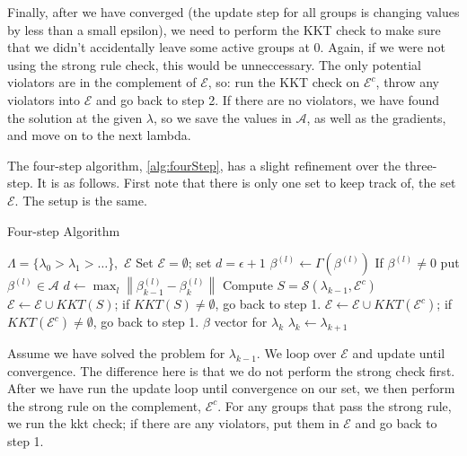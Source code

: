 \documentclass[titlepage]{article}
\newcommand{\norm}[1]{\left\lVert #1 \right\rVert}
\begin{document}
Finally, after we have converged (the update step for all groups is changing values by less than a small epsilon), we need to perform the KKT check to make sure that we didn't accidentally leave some active groups at 0. Again, if we were not using the strong rule check, this would be unneccessary. The only potential violators are in the complement of $\mathcal{E}$, so: run the KKT check on $\mathcal{E}^c$, throw any violators into $\mathcal{E}$ and go back to step 2. If there are no violators, we have found the solution at the given $\lambda$, so we save the values in $\mathcal{A}$, as well as the gradients, and move on to the next lambda.

The four-step algorithm, \autoref{alg:fourStep}, has a slight refinement over the three-step. It is as follows. First note that there is only one set to keep track of, the set $\mathcal{E}$. The setup is the same.

\begin{algorithm}
  \caption{Four-step Algorithm\label{alg:fourStep}}
  \begin{algorithmic}
     $\Lambda = \{\lambda_0>\lambda_1> \dots$\},\ $\mathcal{E}$
    \STATE Set $\mathcal{E}=\emptyset$; set $d=\epsilon+1$ 
    \STATE  $\beta^{(l)} \leftarrow \Gamma (\beta^{(l)})$
    \STATE If $\beta^{(l)} \neq 0$ put $\beta^{(l)} \in \mathcal{A}$	
	\ENDFOR
	\STATE $d \leftarrow \max_{l} \norm{\beta^{(l)}_{k-1}-\beta^{(l)}_{k}}$ 
	\ENDWHILE    
     Compute $S = \mathcal{S}(\lambda_{k-1}, \mathcal{E}^c)$
     $\mathcal{E} \leftarrow  \mathcal{E}\cup KKT(S)$; if $KKT(S) \neq \emptyset$, go back to step 1.  
	 $\mathcal{E} \leftarrow  \mathcal{E}\cup KKT(\mathcal{E}^c)$; if $KKT(\mathcal{E}^c) \neq \emptyset$, go back to step 1.
    \RETURN $\beta$ vector for $\lambda_k$
    \STATE $\lambda_k \leftarrow \lambda_{k+1}$
  \end{algorithmic}
\end{algorithm}



Assume we have solved the problem for $\lambda_{k-1}$. We loop over $\mathcal{E}$ and update until convergence. The difference here is that we do not perform the strong check first. After we have run the update loop until convergence on our set, we then perform the strong rule on the complement, $\mathcal{E}^c$. For any groups that pass the strong rule, we run the kkt check; if there are any violators, put them in $\mathcal{E}$ and go back to step 1. 
\end{document}
